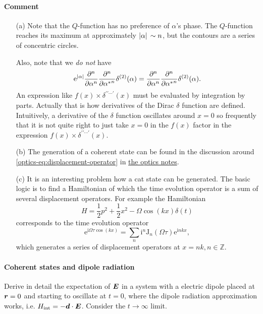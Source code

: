 \documentclass[hyperref, a4paper]{article}
\newcommand{\opticsdoc}{\href{../../optics/optics}{the optics notes}}
\newcommand*{\ii}{\mathrm{i}}
\newcommand*{\ee}{\mathrm{e}}
\begin{document}
\paragraph{Comment} \begin{itemize}
    \item[(a)] Note that the $Q$-function has no preference of $\alpha$'s phase. The $Q$-function reaches its maximum at approximately $\abs*{\alpha} \sim n$, but the contours are a series of concentric circles.
    
    Also, note that we \emph{do not} have 
    \[
        \ee^{\abs*{\alpha}} \pdv[n]{\alpha} \pdv[n]{{\alpha^*}} \delta^{(2)}(\alpha) = \pdv[n]{\alpha} \pdv[n]{{\alpha^*}} \delta^{(2)}(\alpha) .
    \]
    An expression like $f(x) \times \delta^{\prime \prime \cdots \prime}(x)$ must be evaluated by integration by parts. Actually that is how derivatives of the Dirac $\delta$ function are defined.
    Intuitively, a derivative of the $\delta$ function oscillates around $x=0$ so frequently that it is not quite right to just take $x=0$ in the $f(x)$ factor in the expression $f(x) \times \delta^{\prime \prime \cdots \prime}(x)$.
    \item[(b)] The generation of a coherent state can be found in the discussion around \eqref{optics-eq:displacement-operator} in \opticsdoc.
    \item[(c)] It is an interesting problem how a cat state can be generated.  
    The basic logic is to find a Hamiltonian of which the time evolution operator is a sum of several displacement operators.
    For example the Hamiltonian
    \begin{equation}
        H = \frac{1}{2} p^2 + \frac{1}{2} x^2 - \Omega \cos(kx) \delta(t)
    \end{equation} 
    corresponds to the time evolution operator 
    \[
        \ee^{\ii \Omega \tau \cos(kx)} = \sum_n \ii^n \mathrm{J}_n(\Omega \tau) \ee^{\ii n k x},
    \]
    which generates a series of displacement operators at $x = nk, n \in \mathbb{Z}$.
\end{itemize}

\paragraph{}

\paragraph{Coherent states and dipole radiation} Derive in detail the expectation of $\vb*{E}$ in a system with a electric dipole placed at $\vb*{r}=0$ and starting to oscillate at $t=0$, where the dipole radiation approximation works, i.e. $H_\text{int} = - \vb*{d} \cdot \vb*{E}$. Consider the $t \to \infty$ limit.
\end{document}
